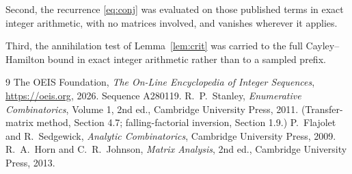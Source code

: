 \documentclass[11pt,a4paper]{article}
\theoremstyle{plain}
\theoremstyle{definition}
\begin{document}
Second, the recurrence \eqref{eq:conj} was evaluated on those published terms in exact
integer arithmetic, with no matrices involved, and vanishes wherever it applies.

Third, the annihilation test of Lemma~\ref{lem:crit} was carried to the full
Cayley--Hamilton bound in exact integer arithmetic rather than to a sampled prefix.

\begin{thebibliography}{9}
 The OEIS Foundation, \emph{The On-Line Encyclopedia of Integer
Sequences}, \url{https://oeis.org}, 2026. Sequence A280119.
 R.~P.~Stanley, \emph{Enumerative Combinatorics}, Volume 1, 2nd ed.,
Cambridge University Press, 2011. (Transfer-matrix method, Section 4.7; falling-factorial
inversion, Section 1.9.)
 P.~Flajolet and R.~Sedgewick, \emph{Analytic Combinatorics}, Cambridge
University Press, 2009.
 R.~A.~Horn and C.~R.~Johnson, \emph{Matrix Analysis}, 2nd ed., Cambridge
University Press, 2013.
\end{thebibliography}
\end{document}
